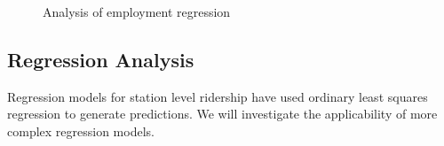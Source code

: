 \documentclass{article}
\begin{document}
\begin{figure}
\begin{minipage}{0.5\textwidth}

\caption{Analysis of employment regression}\label{fig:empresid}
\end{minipage}\hfill
\end{figure}

\subsection{Regression Analysis}

Regression models for station level ridership have used ordinary least squares regression \cite{Kuby2004, Taylor2008, Currie2011, Durning2015, Gutierrez2011} to generate predictions. We will investigate the applicability of more complex regression models.
\end{document}
